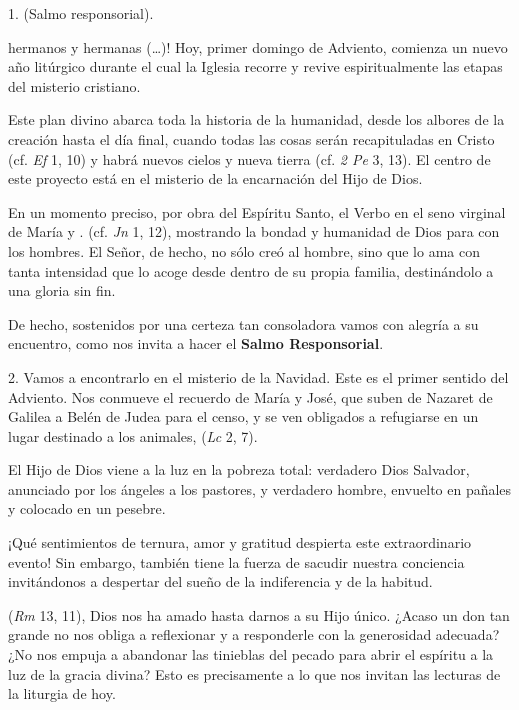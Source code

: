 \begin{body}
	1.  (Salmo responsorial). 
	
	 hermanos y hermanas (\ldots{})! Hoy, primer domingo de Adviento, comienza un nuevo año litúrgico durante el cual la Iglesia recorre y revive espiritualmente las etapas del misterio cristiano. 
	
	Este plan divino abarca toda la historia de la humanidad, desde los albores de la creación hasta el día final, cuando todas las cosas serán recapituladas en Cristo (cf. \emph{Ef} 1, 10) y habrá nuevos cielos y nueva tierra (cf. \emph{2 Pe} 3, 13). El centro de este proyecto está en el misterio de la encarnación del Hijo de Dios. 
	
	En un momento preciso, por obra del Espíritu Santo, el Verbo  en el seno virginal de María y . (cf. \emph{Jn} 1, 12), mostrando la bondad y humanidad de Dios para con los hombres. El Señor, de hecho, no sólo creó al hombre, sino que lo ama con tanta intensidad que lo acoge desde dentro de su propia familia, destinándolo a una gloria sin fin. 
	
	De hecho, sostenidos por una certeza tan consoladora vamos con alegría a su encuentro, como nos invita a hacer el \textbf{Salmo Responsorial}. 
	
	2. Vamos a encontrarlo en el misterio de la Navidad. Este es el primer sentido del Adviento. Nos conmueve el recuerdo de María y José, que suben de Nazaret de Galilea a Belén de Judea para el censo, y se ven obligados a refugiarse en un lugar destinado a los animales,  (\emph{Lc} 2, 7). 
	
	El Hijo de Dios viene a la luz en la pobreza total: verdadero Dios Salvador, anunciado por los ángeles a los pastores, y verdadero hombre, envuelto en pañales y colocado en un pesebre. 
	
	¡Qué sentimientos de ternura, amor y gratitud despierta este extraordinario evento! Sin embargo, también tiene la fuerza de sacudir nuestra conciencia invitándonos a despertar del sueño de la indiferencia y de la habitud. 
	
	 (\emph{Rm} 13, 11), Dios nos ha amado hasta darnos a su Hijo único. ¿Acaso un don tan grande no nos obliga a reflexionar y a responderle con la generosidad adecuada? ¿No nos empuja a abandonar las tinieblas del pecado para abrir el espíritu a la luz de la gracia divina? Esto es precisamente a lo que nos invitan las lecturas de la liturgia de hoy. 
	

\end{body}
